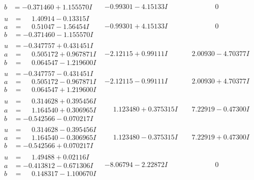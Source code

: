 \documentclass[1p]{elsarticle_modified}
\theoremstyle{definition}
\begin{document}
$$\begin{array}{c|c|c}
\begin{aligned}
b &= -0.371460 + 1.155570 I\end{aligned}
 & -0.99301 - 4.15133 I & \phantom{-0.000000 } 0 \\ \hline\begin{aligned}
u &= \phantom{-}1.40914 - 0.13315 I \\
a &= \phantom{-}0.51047 - 1.56454 I \\
b &= -0.371460 - 1.155570 I\end{aligned}
 & -0.99301 + 4.15133 I & \phantom{-0.000000 } 0 \\ \hline\begin{aligned}
u &= -0.347757 + 0.431451 I \\
a &= \phantom{-}0.505172 + 0.967871 I \\
b &= \phantom{-}0.064547 - 1.219600 I\end{aligned}
 & -2.12115 + 0.99111 I & \phantom{-}2.00930 - 4.70377 I \\ \hline\begin{aligned}
u &= -0.347757 - 0.431451 I \\
a &= \phantom{-}0.505172 - 0.967871 I \\
b &= \phantom{-}0.064547 + 1.219600 I\end{aligned}
 & -2.12115 - 0.99111 I & \phantom{-}2.00930 + 4.70377 I \\ \hline\begin{aligned}
u &= \phantom{-}0.314628 + 0.395456 I \\
a &= \phantom{-}1.164540 + 0.306965 I \\
b &= -0.542566 - 0.070217 I\end{aligned}
 & \phantom{-}1.123480 + 0.375315 I & \phantom{-}7.22919 - 0.47300 I \\ \hline\begin{aligned}
u &= \phantom{-}0.314628 - 0.395456 I \\
a &= \phantom{-}1.164540 - 0.306965 I \\
b &= -0.542566 + 0.070217 I\end{aligned}
 & \phantom{-}1.123480 - 0.375315 I & \phantom{-}7.22919 + 0.47300 I \\ \hline\begin{aligned}
u &= \phantom{-}1.49488 + 0.02116 I \\
a &= -0.413812 - 0.671306 I \\
b &= \phantom{-}0.148317 - 1.100670 I\end{aligned}
 & -8.06794 - 2.22872 I & \phantom{-0.000000 } 0 \\ \hline\begin{aligned}

\end{aligned}
\end{array}$$
\end{document}
